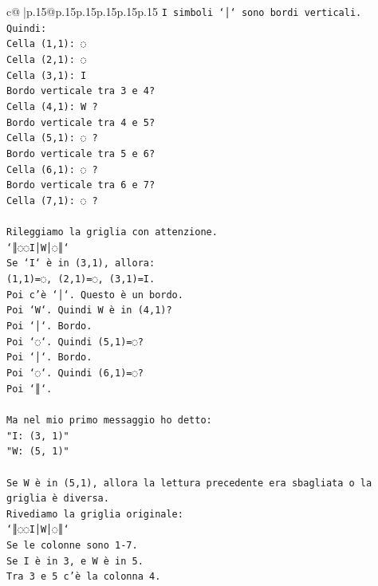 \documentclass{article}
\begin{document}
{\begin{supertabular}{c@{$\;$}|p{.15\linewidth}@{}p{.15\linewidth}p{.15\linewidth}p{.15\linewidth}p{.15\linewidth}p{.15\linewidth}}
{{{\texttt{I simboli `│` sono bordi verticali.} \\
\texttt{Quindi:} \\
\texttt{Cella (1,1): ◌} \\
\texttt{Cella (2,1): ◌} \\
\texttt{Cella (3,1): I} \\
\texttt{Bordo verticale tra 3 e 4?} \\
\texttt{Cella (4,1): W ?} \\
\texttt{Bordo verticale tra 4 e 5?} \\
\texttt{Cella (5,1): ◌ ?} \\
\texttt{Bordo verticale tra 5 e 6?} \\
\texttt{Cella (6,1): ◌ ?} \\
\texttt{Bordo verticale tra 6 e 7?} \\
\texttt{Cella (7,1): ◌ ?} \\
\\ 
\texttt{Rileggiamo la griglia con attenzione.} \\
\texttt{`║◌◌I│W│◌║`} \\
\texttt{Se `I` è in (3,1), allora:} \\
\texttt{(1,1)=◌, (2,1)=◌, (3,1)=I.} \\
\texttt{Poi c'è `│`. Questo è un bordo.} \\
\texttt{Poi `W`. Quindi W è in (4,1)?} \\
\texttt{Poi `│`. Bordo.} \\
\texttt{Poi `◌`. Quindi (5,1)=◌?} \\
\texttt{Poi `│`. Bordo.} \\
\texttt{Poi `◌`. Quindi (6,1)=◌?} \\
\texttt{Poi `║`.} \\
\\ 
\texttt{Ma nel mio primo messaggio ho detto:} \\
\texttt{"I: (3, 1)"} \\
\texttt{"W: (5, 1)"} \\
\\ 
\texttt{Se W è in (5,1), allora la lettura precedente era sbagliata o la griglia è diversa.} \\
\texttt{Rivediamo la griglia originale:} \\
\texttt{`║◌◌I│W│◌║`} \\
\texttt{Se le colonne sono 1{-}7.} \\
\texttt{Se I è in 3, e W è in 5.} \\
\texttt{Tra 3 e 5 c'è la colonna 4.} \\
}}}
\end{supertabular}}
\end{document}

